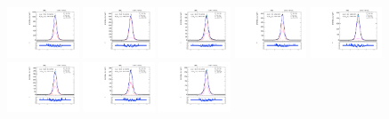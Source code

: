 \begin{figure}[htb]
\includegraphics[width=0.19\textwidth]{plots/Appendix_Recoil_Fits/ZmmData_PF_13TeV_2G_bkg/pfu2fit_8.pdf}
\includegraphics[width=0.19\textwidth]{plots/Appendix_Recoil_Fits/ZmmData_PF_13TeV_2G_bkg/pfu2fit_9.pdf}
\includegraphics[width=0.19\textwidth]{plots/Appendix_Recoil_Fits/ZmmData_PF_13TeV_2G_bkg/pfu2fit_19.pdf}
\includegraphics[width=0.19\textwidth]{plots/Appendix_Recoil_Fits/ZmmData_PF_13TeV_2G_bkg/pfu2fit_11.pdf}
\includegraphics[width=0.19\textwidth]{plots/Appendix_Recoil_Fits/ZmmData_PF_13TeV_2G_bkg/pfu2fit_12.pdf}
\includegraphics[width=0.19\textwidth]{plots/Appendix_Recoil_Fits/ZmmData_PF_13TeV_2G_bkg/pfu2fit_13.pdf}
\includegraphics[width=0.19\textwidth]{plots/Appendix_Recoil_Fits/ZmmData_PF_13TeV_2G_bkg/pfu2fit_14.pdf}
\includegraphics[width=0.19\textwidth]{plots/Appendix_Recoil_Fits/ZmmData_PF_13TeV_2G_bkg/pfu2fit_15.pdf}

\end{figure}
